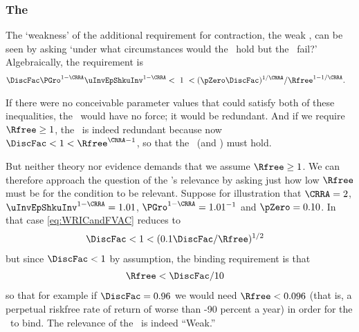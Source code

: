 \documentclass[BufferStockTheory]{subfiles}
\begin{document}
\subsubsection{The \WRIC}

The `weakness' of the additional requirement for contraction, the
weak \RIC, can be seen by asking `under what circumstances
would the \FVAC~hold but the \WRIC~fail?'
Algebraically, the requirement is
\begin{equation}\begin{gathered}\begin{aligned}
  \DiscFac \PGro^{1-\CRRA}\uInvEpShkuInv^{1-\CRRA} & < ~ 1 ~ <  (\pZero \DiscFac)^{1/\CRRA}/\Rfree^{1-1/\CRRA}. \label{eq:WRICandFVAC}
\end{aligned}\end{gathered}\end{equation}

If there were no conceivable parameter values that could satisfy both
of these inequalities, the \WRIC~would have no force; it would be
redundant.  And if we require $\Rfree \geq 1$, the \WRIC~is indeed
redundant because now $\DiscFac <1<\Rfree^{\CRRA-1}$, so that the \RIC~(and \WRIC) must hold.

But neither theory nor evidence demands that we assume $\Rfree \geq
1$.  We can therefore approach the question of the \WRIC's relevance by
asking just how low $\Rfree$ must be for the condition to be relevant.
Suppose for illustration that $\CRRA=2$, $\uInvEpShkuInv^{1-\CRRA}=1.01$,
$\PGro^{1-\CRRA}=1.01^{-1}$ and $\pZero = 0.10$.  In that case
\eqref{eq:WRICandFVAC} reduces to
\begin{equation}\begin{gathered}\begin{aligned}
  \DiscFac  & < 1 < (0.1 \DiscFac/\Rfree)^{1/2} \notag
\end{aligned}\end{gathered}\end{equation}
but since $\DiscFac < 1$ by assumption, the binding requirement is that
\begin{equation}\begin{gathered}\begin{aligned}
  \Rfree  & < \DiscFac/10 \notag
\end{aligned}\end{gathered}\end{equation}
so that for example if $\DiscFac=0.96$ we would need $\Rfree < 0.096$
(that is, a perpetual riskfree rate of return of worse than -90
percent a year) in order for the \WRIC~to bind.
The relevance of the \WRIC~is indeed ``Weak.''
\end{document}
